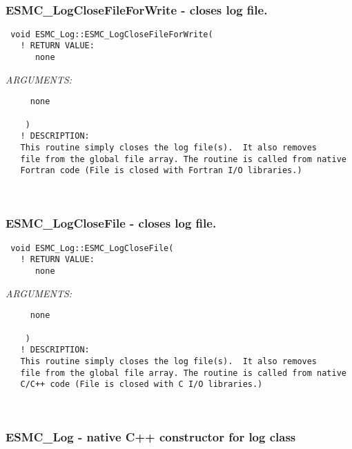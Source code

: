  
\mbox{}\hrulefill\ 
 
\subsubsection [ESMC\_LogCloseFileForWrite] {ESMC\_LogCloseFileForWrite - closes log file. }


  
\begin{verbatim} void ESMC_Log::ESMC_LogCloseFileForWrite(
   ! RETURN VALUE:
      none\end{verbatim}{\em ARGUMENTS:}
\begin{verbatim}     none
 
    )
   ! DESCRIPTION:
   This routine simply closes the log file(s).  It also removes
   file from the global file array. The routine is called from native
   Fortran code (File is closed with Fortran I/O libraries.)\end{verbatim}
 
 
\mbox{}\hrulefill\ 
 
\subsubsection [ESMC\_LogCloseFile] {ESMC\_LogCloseFile - closes log file. }


  
\begin{verbatim} void ESMC_Log::ESMC_LogCloseFile(
   ! RETURN VALUE:
      none\end{verbatim}{\em ARGUMENTS:}
\begin{verbatim}     none
 
    )
   ! DESCRIPTION:
   This routine simply closes the log file(s).  It also removes
   file from the global file array. The routine is called from native
   C/C++ code (File is closed with C I/O libraries.)\end{verbatim}
 
 
\mbox{}\hrulefill\ 
 
\subsubsection [ESMC\_Log] {ESMC\_Log - native C++ constructor for log class}


